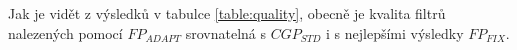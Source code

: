 \documentclass[fleqn,11pt]{ExcelAtFIT} %
\begin{document}
Jak je vidět z výsledků v tabulce \ref{table:quality}, obecně je kvalita filtrů nalezených pomocí $\mathit{FP_{ADAPT}}$ srovnatelná s $\mathit{CGP_{STD}}$ i s nejlepšími výsledky $\mathit{FP_{FIX}}$.

\end{document}
